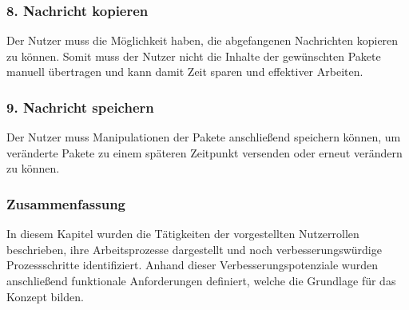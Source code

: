         \subsubsection{8. Nachricht kopieren}
        Der Nutzer muss die Möglichkeit haben, die abgefangenen Nachrichten kopieren zu können. Somit muss der Nutzer nicht die Inhalte der gewünschten Pakete manuell übertragen und kann damit Zeit sparen und effektiver Arbeiten.
        
        \subsubsection{9. Nachricht speichern}
        Der Nutzer muss Manipulationen der Pakete anschließend speichern können, um veränderte Pakete zu einem späteren Zeitpunkt versenden oder erneut verändern zu können.
        
\subsubsection{Zusammenfassung}
    In diesem Kapitel wurden die Tätigkeiten der vorgestellten Nutzerrollen beschrieben, ihre Arbeitsprozesse dargestellt und noch verbesserungswürdige Prozessschritte identifiziert. Anhand dieser Verbesserungspotenziale wurden anschließend funktionale Anforderungen definiert, welche die Grundlage für das Konzept bilden.